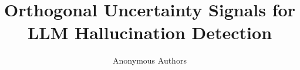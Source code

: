 \documentclass[10pt,letterpaper]{article}
\title{Orthogonal Uncertainty Signals for LLM Hallucination Detection}
\author{Anonymous Authors}
\date{}
\begin{document}
\maketitle

\begin{abstract}

\end{abstract}











\end{document}
